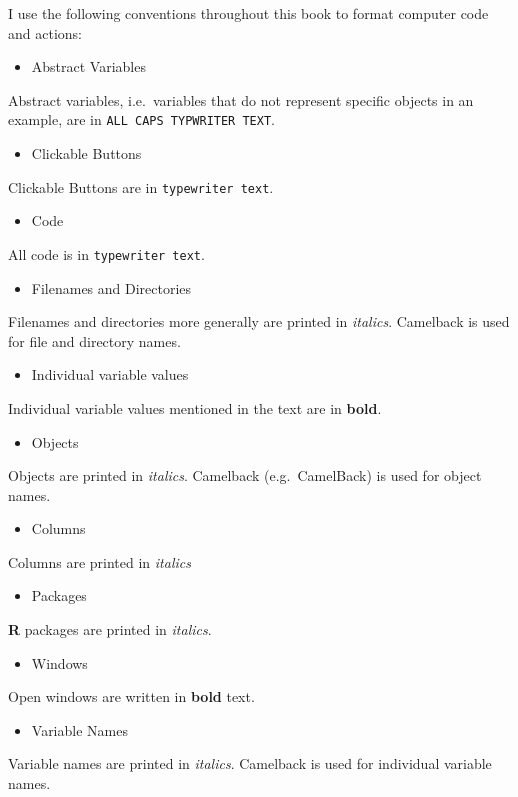 I use the following conventions throughout this book to format computer
code and actions:

\begin{itemize}
\item
  Abstract Variables
\end{itemize}
Abstract variables, i.e.~variables that do not represent specific
objects in an example, are in \texttt{ALL CAPS TYPWRITER TEXT}.

\begin{itemize}
\item
  Clickable Buttons
\end{itemize}
Clickable Buttons are in \texttt{typewriter text}.

\begin{itemize}
\item
  Code
\end{itemize}
All code is in \texttt{typewriter text}.

\begin{itemize}
\item
  Filenames and Directories
\end{itemize}
Filenames and directories more generally are printed in \emph{italics}.
Camelback is used for file and directory names.

\begin{itemize}
\item
  Individual variable values
\end{itemize}
Individual variable values mentioned in the text are in \textbf{bold}.

\begin{itemize}
\item
  Objects
\end{itemize}
Objects are printed in \emph{italics}. Camelback (e.g.~CamelBack) is
used for object names.

\begin{itemize}
\item
  Columns
\end{itemize}
Columns are printed in \emph{italics}

\begin{itemize}
\item
  Packages
\end{itemize}
\textbf{R} packages are printed in \emph{italics}.

\begin{itemize}
\item
  Windows
\end{itemize}
Open windows are written in \textbf{bold} text.

\begin{itemize}
\item
  Variable Names
\end{itemize}
Variable names are printed in \emph{italics}. Camelback is used for
individual variable names.
